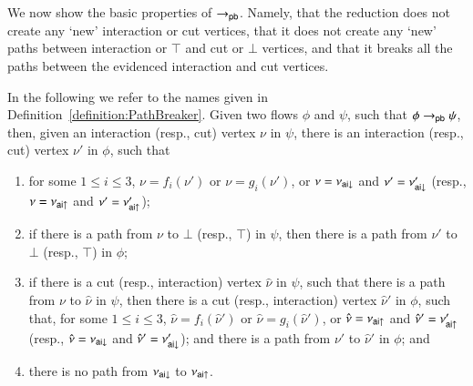 
We now show the basic properties of $\to_{\mathsf{pb}}$. Namely, that the reduction does not create any `new' interaction or cut vertices, that it does not create any `new' paths between interaction or $\top$ and cut or $\bot$ vertices, and that it breaks all the paths between the evidenced interaction and cut vertices.



\begin{lemma}\label{lemma:PathBreaker}
In the following we refer to the names given in Definition~\vref{definition:PathBreaker}. Given two flows $\phi$ and $\psi$, such that $\phi\to_{\mathsf{pb}}\psi$, then, given an interaction (resp., cut) vertex $\nu$ in $\psi$, there is an interaction (resp., cut) vertex $\nu'$ in $\phi$, such that
\begin{enumerate}
\item for some $1\le i\le 3$, $\nu=f_i(\nu')$ or $\nu=g_i(\nu')$, or $\nu=\nu_{{\mathsf{ai}}{\downarrow}}$ and $\nu'=\nu'_{{\mathsf{ai}}{\downarrow}}$ (resp., $\nu=\nu_{{\mathsf{ai}}{\uparrow}}$ and $\nu'=\nu'_{{\mathsf{ai}}{\uparrow}}$);
\item if there is a path from $\nu$ to $\bot$ (resp., $\top$) in $\psi$, then there is a path from $\nu'$ to $\bot$ (resp., $\top$) in $\phi$;
\item if there is a cut (resp., interaction) vertex $\hat\nu$ in $\psi$, such that there is a path from $\nu$ to $\hat\nu$ in $\psi$, then there is a cut (resp., interaction) vertex $\hat\nu'$ in $\phi$, such that, for some $1\le i\le 3$, $\hat\nu=f_i(\hat\nu')$ or $\hat\nu=g_i(\hat\nu')$, or $\hat\nu=\nu_{{\mathsf{ai}}{\uparrow}}$ and $\hat\nu'=\nu'_{{\mathsf{ai}}{\uparrow}}$ (resp., $\hat\nu=\nu_{{\mathsf{ai}}{\downarrow}}$ and $\hat\nu'=\nu'_{{\mathsf{ai}}{\downarrow}}$); and there is a path from $\nu'$ to $\hat\nu'$ in $\phi$; and
\item there is no path from $\nu_{{\mathsf{ai}}{\downarrow}}$ to $\nu_{{\mathsf{ai}}{\uparrow}}$.
\end{enumerate}
\end{lemma}

